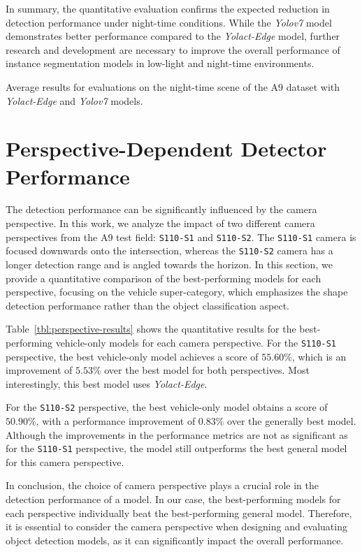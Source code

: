 In summary, the quantitative evaluation confirms the expected reduction in detection performance under night-time conditions.
While the \textit{Yolov7} model demonstrates better performance compared to the \textit{Yolact-Edge} model, further research and development are necessary to improve the overall performance of instance segmentation models in low-light and night-time environments.

\begin{table}[htb]
    
    \caption{Average results for evaluations on the night-time scene of the A9 dataset with \textit{Yolact-Edge} and \textit{Yolov7} models.}
    \label{tbl:nighttime-results}
\end{table}

\section{Perspective-Dependent Detector Performance}
\label{sec:perspective}

The detection performance can be significantly influenced by the camera perspective.
In this work, we analyze the impact of two different camera perspectives from the A9 test field: \texttt{S110-S1} and \texttt{S110-S2}.
The \texttt{S110-S1} camera is focused downwards onto the intersection, whereas the \texttt{S110-S2} camera has a longer detection range and is angled towards the horizon.
In this section, we provide a quantitative comparison of the best-performing models for each perspective, focusing on the vehicle super-category, which emphasizes the shape detection performance rather than the object classification aspect.

Table~\ref{tbl:perspective-results} shows the quantitative results for the best-performing vehicle-only models for each camera perspective.
For the \texttt{S110-S1} perspective, the best vehicle-only model achieves a score of $55.60\%$, which is an improvement of $5.53\%$ over the best model for both perspectives.
Most interestingly, this best model uses \textit{Yolact-Edge}.

For the \texttt{S110-S2} perspective, the best vehicle-only model obtains a score of $50.90\%$, with a performance improvement of $0.83\%$ over the generally best model.
Although the improvements in the performance metrics are not as significant as for the \texttt{S110-S1} perspective, the model still outperforms the best general model for this camera perspective.

In conclusion, the choice of camera perspective plays a crucial role in the detection performance of a model.
In our case, the best-performing models for each perspective individually beat the best-performing general model.
Therefore, it is essential to consider the camera perspective when designing and evaluating object detection models, as it can significantly impact the overall performance.

